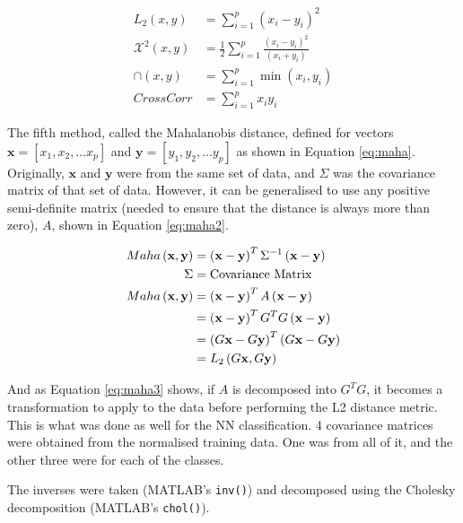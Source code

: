 \documentclass[a4paper, 10pt, conference]{ieeeconf}
\begin{document}
\begin{align}
  L_2 \left( x, y \right) &= \sum_{i = 1}^{p} \left( x_i  - y_i \right) ^2 \label{eq:l22}\\
  \mathcal{X}^2 \left( x, y \right) &= \frac{1}{2} \sum_{i = 1}^{p} \frac{\left( x_i - y_i \right) ^2 }{\left( x_i + y_i \right)} \label{eq:chi}\\
  \cap \left( x, y \right) &= \sum_{i = 1}^{p} \min \left( x_i, y_i \right) \label{eq:intersection}\\
  CrossCorr &= \sum_{i = 1}^{p} x_i y_i \label{eq:corr}
\end{align}

The fifth method, called the Mahalanobis distance, defined for vectors $\mathbf{x} = [x_1, x_2, \ldots x_p]$ and $\mathbf{y} = [y_1, y_2, \ldots y_p]$ as shown in Equation \ref{eq:maha}. Originally, $\mathbf{x}$ and $\mathbf{y}$ were from the same set of data, and $\Sigma$ was the covariance matrix of that set of data. However, it can be generalised to use any positive semi-definite matrix (needed to ensure that the distance is always more than zero), $A$, shown in Equation \ref{eq:maha2}.

\begin{align}
  Maha \left( \mathbf{x}, \mathbf{y} \right) &= \left( \mathbf{x} - \mathbf{y} \right) ^T \Sigma^{-1} \left( \mathbf{x} - \mathbf{y} \right)\label{eq:maha}\\
  \Sigma &= \text{Covariance Matrix}\notag\\
  Maha \left( \mathbf{x}, \mathbf{y} \right)&= \left( \mathbf{x} - \mathbf{y} \right) ^T A \left( \mathbf{x} - \mathbf{y}\right)\label{eq:maha2}\\
  &= \left( \mathbf{x} - \mathbf{y} \right) ^T G^T G \left( \mathbf{x} - \mathbf{y}\right)\notag\\
  &= \left( G\mathbf{x} - G\mathbf{y} \right) ^T \left( G\mathbf{x} - G\mathbf{y}\right)\notag\\
  &= L_2\left( G\mathbf{x}, G\mathbf{y} \right) \label{eq:maha3}
\end{align}

And as Equation \ref{eq:maha3} shows, if $A$ is decomposed into $G^TG$, it becomes a transformation to apply to the data before performing the L2 distance metric. This is what was done as well for the NN classification. 4 covariance matrices were obtained from the normalised training data. One was from all of it, and the other three were for each of the classes.

The inverses were taken (MATLAB's \texttt{inv()}) and decomposed using the Cholesky decomposition (MATLAB's \texttt{chol()}).
\end{document}
